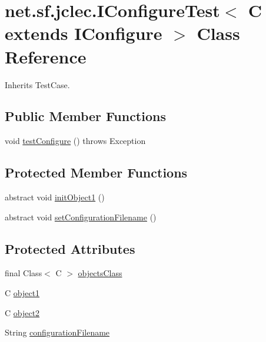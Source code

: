\hypertarget{classnet_1_1sf_1_1jclec_1_1_i_configure_test_3_01_c_01extends_01_i_configure_01_4}{\section{net.\-sf.\-jclec.\-I\-Configure\-Test$<$ C extends I\-Configure $>$ Class Reference}
\label{classnet_1_1sf_1_1jclec_1_1_i_configure_test_3_01_c_01extends_01_i_configure_01_4}
}


Inherits Test\-Case.

\subsection*{Public Member Functions}
\begin{DoxyCompactItemize}
\item 
void \hyperlink{classnet_1_1sf_1_1jclec_1_1_i_configure_test_3_01_c_01extends_01_i_configure_01_4_ab4e95a5dcca33ab25bc41e6df48c1d0a}{test\-Configure} ()  throws Exception 	
\end{DoxyCompactItemize}
\subsection*{Protected Member Functions}
\begin{DoxyCompactItemize}
\item 
abstract void \hyperlink{classnet_1_1sf_1_1jclec_1_1_i_configure_test_3_01_c_01extends_01_i_configure_01_4_a1b544aece8bb944326be9c7bde0dd78d}{init\-Object1} ()
\item 
abstract void \hyperlink{classnet_1_1sf_1_1jclec_1_1_i_configure_test_3_01_c_01extends_01_i_configure_01_4_a133113bc959203acd16c8ae1a0dade5b}{set\-Configuration\-Filename} ()
\end{DoxyCompactItemize}
\subsection*{Protected Attributes}
\begin{DoxyCompactItemize}
\item 
final Class$<$ C $>$ \hyperlink{classnet_1_1sf_1_1jclec_1_1_i_configure_test_3_01_c_01extends_01_i_configure_01_4_a7bcdfe6bb9c3b0379d86b3770482c55d}{objects\-Class}
\item 
C \hyperlink{classnet_1_1sf_1_1jclec_1_1_i_configure_test_3_01_c_01extends_01_i_configure_01_4_a6c5dc413dee2d9a5db86f127213385fd}{object1}
\item 
C \hyperlink{classnet_1_1sf_1_1jclec_1_1_i_configure_test_3_01_c_01extends_01_i_configure_01_4_a3f26ecb80960a7bcd2111f25ae08b121}{object2}
\item 
String \hyperlink{classnet_1_1sf_1_1jclec_1_1_i_configure_test_3_01_c_01extends_01_i_configure_01_4_a65c54b732dc525be0921baa3f5c35e09}{configuration\-Filename}
\end{DoxyCompactItemize}


